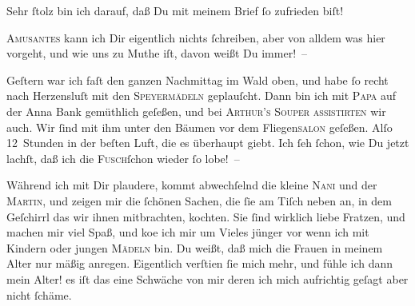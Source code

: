 \pstart
           {\pb}Sehr{ }ſtolz bin ich darauf, daß Du mit meinem Brief{ }ſo
               zufrieden biſt!\pend
           
\pstart
           \textsc{Amusantes} kann ich Dir eigentlich nichts{ }ſchreiben, aber
               von alldem was hier vorgeht, und wie uns zu Muthe iſt, davon weißt Du immer! –\pend
           
\pstart
           Geſtern war ich faſt den ganzen Nachmittag im Wald oben, und habe{ }ſo recht nach
               Herzensluſt mit den \textsc{Speyermädeln} geplauſcht. Dann bin ich mit \textsc{Papa} auf der Anna Bank gemüthlich geſeßen, und bei \textsc{Arthur’s
                  Souper assistirten} wir auch. Wir{ }ſind mit ihm unter den Bäumen vor dem
                  Fliegen\textsc{salon} geſeßen. Alſo 12 Stunden in der beſten
               Luft, die es überhaupt giebt. Ich{ }ſeh{ }ſchon, wie Du jetzt lachſt, daß ich die \textsc{Fusch}ſchon wieder{ }ſo lobe! –\pend
           
\pstart
           Während ich mit Dir plaudere, kommt abwechſelnd die kleine \textsc{Nani} und der \textsc{Martin}, und zeigen mir die{ }ſchönen Sachen, die{ }ſie am Tiſch neben an, in dem Geſchirrl
               das {\pb}wir ihnen mitbrachten, kochten. Sie{ }ſind wirklich
               liebe Fratzen, und machen mir viel Spaß, und ko{\geminationm}e ich
               mir um Vieles jünger vor wenn ich mit Kindern oder jungen \textsc{Mädeln} bin. Du weißt, daß mich die Frauen in meinem Alter nur mäßig anregen.
               Eigentlich verſti{\geminationm}en{ }ſie mich mehr, und fühle ich dann
               mein Alter! es iſt das eine Schwäche von mir deren ich mich aufrichtig geſagt aber
               nicht{ }ſchäme.\pend
           
